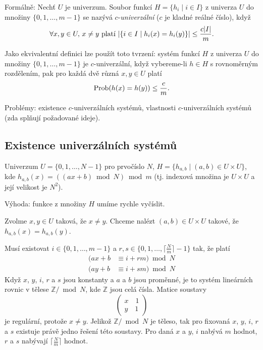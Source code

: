 \documentclass[a4paper,12pt]{article}
\begin{document}
Formálně: Nechť  $U$ je univerzum. Soubor  
funkcí $H=\{h_i\mid i\in I\}$ z univerza $U$ do množiny $\{
0,1,\dots,m-1\}$ se 
nazývá $c$-\emph{univerzální} ($c$ je kladné reálné číslo), 
když 
$$\forall x,y\in U,\,x\ne y\text{\rm\ platí }|\{i\in I\mid h_
i(x)=h_i(y)\}|\le\frac {c|I|}m.$$

Jako ekvivalentní definici lze použít toto tvrzení: systém funkcí $
H$ z univerza $U$ do množiny $\{0,1,\dots,m-1\}$ je $c$-univerzální,
když vybereme-li $h\in H$ s rovnoměrným rozděle\-ním, pak pro 
každá dvě různá $x,y\in U$ platí 
$$\operatorname{Prob}(h(x)=h(y))\le\frac cm.$$

Problémy: existence $c$-univerzálních 
systémů, \newline 
vlastnosti $c$-univerzálních systémů (zda splňují 
požadované ide\-je).

\subsection{
Existence univerzálních systémů
}

Univerzum $U=\{0,1,\dots,N-1\}$ pro prvočíslo $N$,\newline 
$H=\{h_{a,b}\mid (a,b)\in U\times U\}$,\newline 
kde $h_{a,b}(x)=((ax+b)\bmod N)\bmod m$\newline 
(tj. indexová množina je $U\times U$ a její velikost je $
N^2$).

Výhoda: funkce z množiny $H$ umíme rychle 
vyčíslit.

Zvolme $x,y\in U$ taková, že $x\ne y$. Chceme nalézt 
$(a,b)\in U\times U$ takové, že $h_{a,b}(x)=h_{a,b}(y)$. 

Musí existovat $i\in \{0,1,\dots,m-1\}$ a 
$r,s\in \{0,1,\dots,\lceil\frac Nm\rceil -1\}$ tak, že platí
\begin{align*}(ax+b&\equiv i+rm)\bmod N\\
(ay+b&\equiv i+sm)\bmod N\end{align*}
Když $x$, $y$, $i$, $r$ a $s$ jsou konstanty a $a$ a $b$ jsou 
proměnné, je to systém lineárních rovnic v tělese 
$\mathbb Z/\bmod N$, kde $\mathbb Z$ jsou celá čísla. Matice soustavy  
$$\begin{pmatrix} x\quad 1\\
y\quad 1\end{pmatrix} $$
je regulární, protože $x\ne y$. Jelikož $\mathbb Z/\bmod N$ je těleso, tak 
 pro fixovaná $x$, $y$, $i$, $r$ a $s$ existuje právě jedno řešení této soustavy.
Pro daná $x$ a $y$, $i$ nabývá $m$ hodnot, $r$ a $s$ nabývají 
$\lceil\frac Nm\rceil$ hodnot. 
\end{document}
